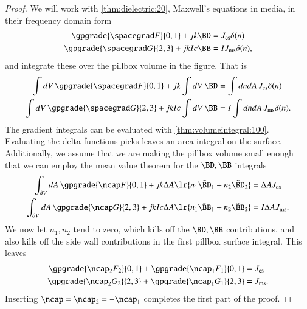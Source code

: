 \begin{proof}
We will work with \cref{thm:dielectric:20}, Maxwell's equations in media, in their frequency domain form
\begin{dmath}\label{eqn:boundarySurfaceSources:480}
\begin{aligned}
\gpgrade{ \spacegrad F }{0,1} + j k \BD &= J_{\textrm{es}} \delta(n) \\
\gpgrade{ \spacegrad G }{2,3} + j k I c \BB &= I J_{\textrm{ms}} \delta(n),
\end{aligned}
\end{dmath}
and integrate these over the pillbox volume in the figure.  That is
\begin{dmath}\label{eqn:boundarySurfaceSources:500}
\begin{aligned}
\int dV\, \gpgrade{ \spacegrad F }{0,1} + j k \int dV\, \BD &= \int dn dA\, J_{\textrm{es}} \delta(n) \\
\int dV\, \gpgrade{ \spacegrad G }{2,3} + j k I c \int dV\, \BB &= I \int dn dA\, J_{\textrm{ms}} \delta(n).
\end{aligned}
\end{dmath}
The gradient integrals can be evaluated with \cref{thm:volumeintegral:100}.  Evaluating the delta functions picks leaves an area integral on the surface.  Additionally, we assume that we are making the pillbox volume small enough that we can employ the mean value theorem for the \( \BD, \BB \) integrals
\begin{dmath}\label{eqn:boundarySurfaceSources:520}
\begin{aligned}
\int_{\partial V} dA\, \gpgrade{ \ncap F }{0,1} + j k \Delta A \lr{ n_1 \tilde{\BD}_1 + n_2 \tilde{\BD}_2 } &= \Delta A J_{\textrm{es}} \\
\int_{\partial V} dA\, \gpgrade{ \ncap G }{2,3} + j k I c \Delta A \lr{ n_1 \tilde{\BB}_1 + n_2 \tilde{\BB}_2} &= I \Delta A J_{\textrm{ms}}.
\end{aligned}
\end{dmath}
We now let \( n_1, n_2 \) tend to zero, which kills off the \( \BD, \BB \) contributions, and also kills off the side wall contributions in the first pillbox surface integral.  This leaves
\begin{dmath}\label{eqn:boundarySurfaceSources:540}
\begin{aligned}
\gpgrade{ \ncap_2 F_2 }{0,1} + \gpgrade{ \ncap_1 F_1 }{0,1} &= J_{\textrm{es}} \\
\gpgrade{ \ncap_2 G_2 }{2,3} + \gpgrade{ \ncap_1 G_1 }{2,3} &= J_{\textrm{ms}}.
\end{aligned}
\end{dmath}
Inserting \( \ncap = \ncap_2 = -\ncap_1 \) completes the first part of the proof.


\end{proof}
